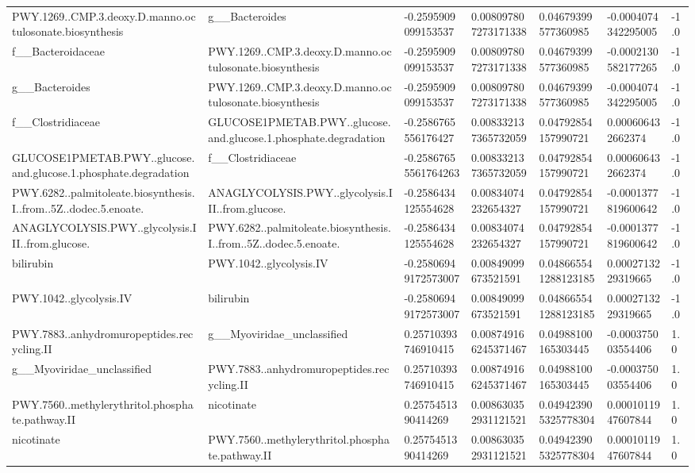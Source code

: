 \begin{longtable}{lllllll}
PWY.1269..CMP.3.deoxy.D.manno.octulosonate.biosynthesis & g\_\_Bacteroides & -0.2595909099153537 & 0.008097807273171338 & 0.04679399577360985 & -0.0004074342295005 & -1.0 \\
f\_\_Bacteroidaceae & PWY.1269..CMP.3.deoxy.D.manno.octulosonate.biosynthesis & -0.2595909099153537 & 0.008097807273171338 & 0.04679399577360985 & -0.0002130582177265 & -1.0 \\
g\_\_Bacteroides & PWY.1269..CMP.3.deoxy.D.manno.octulosonate.biosynthesis & -0.2595909099153537 & 0.008097807273171338 & 0.04679399577360985 & -0.0004074342295005 & -1.0 \\
f\_\_Clostridiaceae & GLUCOSE1PMETAB.PWY..glucose.and.glucose.1.phosphate.degradation & -0.2586765556176427 & 0.008332137365732059 & 0.04792854157990721 & 0.000606432662374 & -1.0 \\
GLUCOSE1PMETAB.PWY..glucose.and.glucose.1.phosphate.degradation & f\_\_Clostridiaceae & -0.25867655561764263 & 0.008332137365732059 & 0.04792854157990721 & 0.000606432662374 & -1.0 \\
PWY.6282..palmitoleate.biosynthesis.I..from..5Z..dodec.5.enoate. & ANAGLYCOLYSIS.PWY..glycolysis.III..from.glucose. & -0.2586434125554628 & 0.00834074232654327 & 0.04792854157990721 & -0.0001377819600642 & -1.0 \\
ANAGLYCOLYSIS.PWY..glycolysis.III..from.glucose. & PWY.6282..palmitoleate.biosynthesis.I..from..5Z..dodec.5.enoate. & -0.2586434125554628 & 0.00834074232654327 & 0.04792854157990721 & -0.0001377819600642 & -1.0 \\
bilirubin & PWY.1042..glycolysis.IV & -0.25806949172573007 & 0.00849099673521591 & 0.048665541288123185 & 0.0002713229319665 & -1.0 \\
PWY.1042..glycolysis.IV & bilirubin & -0.25806949172573007 & 0.00849099673521591 & 0.048665541288123185 & 0.0002713229319665 & -1.0 \\
PWY.7883..anhydromuropeptides.recycling.II & g\_\_Myoviridae\_unclassified & 0.25710393746910415 & 0.008749166245371467 & 0.04988100165303445 & -0.000375003554406 & 1.0 \\
g\_\_Myoviridae\_unclassified & PWY.7883..anhydromuropeptides.recycling.II & 0.25710393746910415 & 0.008749166245371467 & 0.04988100165303445 & -0.000375003554406 & 1.0 \\
PWY.7560..methylerythritol.phosphate.pathway.II & nicotinate & 0.2575451390414269 & 0.008630352931121521 & 0.049423905325778304 & 0.0001011947607844 & 1.0 \\
nicotinate & PWY.7560..methylerythritol.phosphate.pathway.II & 0.2575451390414269 & 0.008630352931121521 & 0.049423905325778304 & 0.0001011947607844 & 1.0 \\

\end{longtable}

